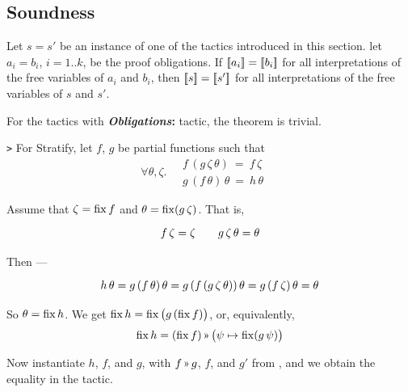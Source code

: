 \subsection{Soundness}
\label{tactics:soundness}

\renewenvironment{proof}{\noindent{\bf Proof.~}}{}

\begin{theorem}
Let $s=s'$ be an instance of one of the tactics introduced in this section.
let $a_i=b_i$, $i=1..k$, be the proof obligations. If $[\![{a_i}]\!]=[\![{b_i}]\!]$
for all interpretations of the free variables of $a_i$ and $b_i$, then
$[\![{s}]\!]=[\![{s'}]\!]$ for all interpretations of the free variables of $s$ and $s'$.
\end{theorem}

\begin{proof}
For the tactics with \textbf{\textit{Obligations}:} tactic, the theorem is trivial.

\medskip
\noindent
{\tt >} For {\sf Stratify}, let $f$, $g$ be partial functions such that
\vspace{-.5em}
\[\renewcommand\arraystretch{1.3}
  \forall \theta,\zeta.\quad \begin{array}{l}f\,(g\,\zeta\,\theta) ~=~ f\,\zeta \\
  g\,(f\,\theta)\,\theta ~=~ h\,\theta
  \end{array}\quad\]
  
Assume that $\zeta = \operatorname{fix} f$ and $\theta = \operatorname{fix} (g\,\zeta)$. That is,
\vspace{-.5em}
\[\renewcommand\arraystretch{1.3}
  \begin{array}{l@{\qquad}l}
    f\,\zeta = \zeta &
    g\,\zeta\,\theta = \theta
  \end{array}\]
  
\vspace{-.5em}
Then ---
\vspace{-.8em}
\[\renewcommand\arraystretch{1.3}
  \begin{array}{l@{}l}
   h\,\theta & {}= g\,(f\,\theta)\,\theta = g\,(f\,(g\,\zeta\,\theta))\,\theta =
              g\,(f\,\zeta)\,\theta = \theta
  \end{array}\]
  
So $\theta = \operatorname{fix} h$. We get $\operatorname{fix} h = \operatorname{fix} \big(g \,(\operatorname{fix} f)\big)$, or, equivalently,
\[\fix h = (\fix f) \applt \big(\psi\mapsto\fix (g\,\psi)\big)\]

Now instantiate $h$, $f$, and $g$, with $f\applt g$, $f$, and $g'$ from ,
and we obtain the equality in the tactic.


\end{proof}
